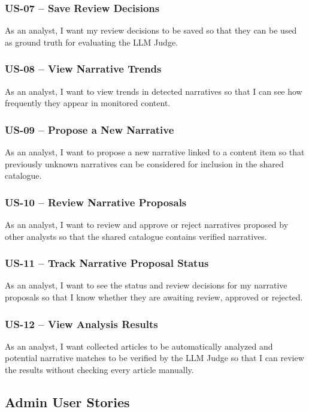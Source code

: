\documentclass[12pt,a4paper]{article}
\begin{document}
\subsubsection*{US-07 -- Save Review Decisions}
As an analyst, I want my review decisions to be saved so that they can be used as ground truth for evaluating the LLM Judge.

\subsubsection*{US-08 -- View Narrative Trends}
As an analyst, I want to view trends in detected narratives so that I can see how frequently they appear in monitored content.

\subsubsection*{US-09 -- Propose a New Narrative}
As an analyst, I want to propose a new narrative linked to a content item
so that previously unknown narratives can be considered for inclusion
in the shared catalogue.

\subsubsection*{US-10 -- Review Narrative Proposals}
As an analyst, I want to review and approve or reject narratives proposed
by other analysts so that the shared catalogue contains verified narratives.

\subsubsection*{US-11 -- Track Narrative Proposal Status}
As an analyst, I want to see the status and review decisions for my narrative
proposals so that I know whether they are awaiting review, approved or rejected.

\subsubsection*{US-12 -- View Analysis Results}


As an analyst, I want collected articles to be automatically analyzed and potential narrative matches to be verified by the LLM Judge so that I can review the results without checking every article manually.

\subsection{Admin User Stories}
\end{document}
